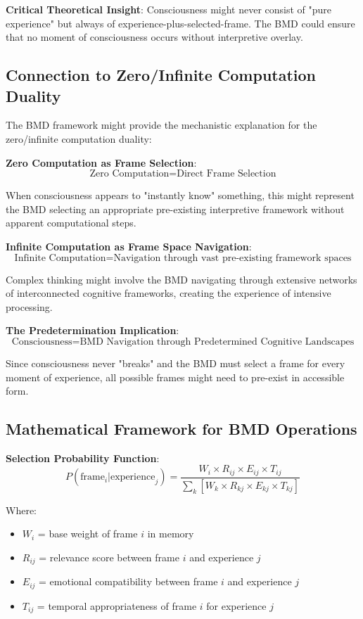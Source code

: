 \documentclass[12pt]{article}
\begin{document}
\textbf{Critical Theoretical Insight}: Consciousness might never consist of "pure experience" but always of experience-plus-selected-frame. The BMD could ensure that no moment of consciousness occurs without interpretive overlay.

\subsection{Connection to Zero/Infinite Computation Duality}

The BMD framework might provide the mechanistic explanation for the zero/infinite computation duality:

\textbf{Zero Computation as Frame Selection}:
$$\text{Zero Computation} = \text{Direct Frame Selection}$$

When consciousness appears to "instantly know" something, this might represent the BMD selecting an appropriate pre-existing interpretive framework without apparent computational steps.

\textbf{Infinite Computation as Frame Space Navigation}:
$$\text{Infinite Computation} = \text{Navigation through vast pre-existing framework spaces}$$

Complex thinking might involve the BMD navigating through extensive networks of interconnected cognitive frameworks, creating the experience of intensive processing.

\textbf{The Predetermination Implication}:
$$\text{Consciousness} = \text{BMD Navigation through Predetermined Cognitive Landscapes}$$

Since consciousness never "breaks" and the BMD must select a frame for every moment of experience, all possible frames might need to pre-exist in accessible form.

\subsection{Mathematical Framework for BMD Operations}

\textbf{Selection Probability Function}:
$$P(\text{frame}_i | \text{experience}_j) = \frac{W_i \times R_{ij} \times E_{ij} \times T_{ij}}{\sum_k[W_k \times R_{kj} \times E_{kj} \times T_{kj}]}$$

Where:
\begin{itemize}
\item $W_i$ = base weight of frame $i$ in memory
\item $R_{ij}$ = relevance score between frame $i$ and experience $j$
\item $E_{ij}$ = emotional compatibility between frame $i$ and experience $j$
\item $T_{ij}$ = temporal appropriateness of frame $i$ for experience $j$
\end{itemize}
\end{document}
